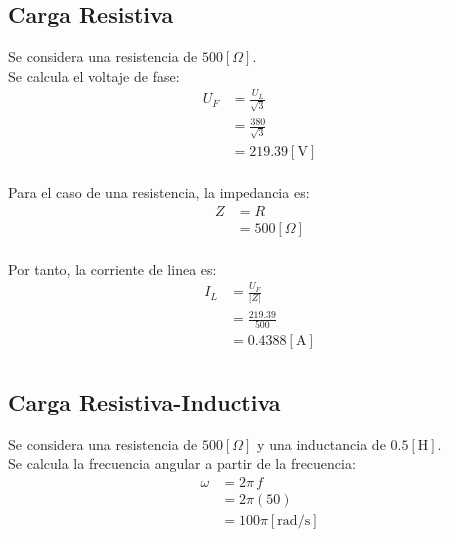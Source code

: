 \documentclass[letter,11pt]{article}
\begin{document}
\subsection{Carga Resistiva}
Se considera una resistencia de $500[\Omega]$.\\

Se calcula el voltaje de fase:
\begin{equation*}
    \begin{split}
        U_F&=\frac{U_L}{\sqrt{3}}\\
           &=\frac{380}{\sqrt{3}}\\
           &=219.39[\text{V}]\\
    \end{split}
\end{equation*}

Para el caso de una resistencia, la impedancia es:
\begin{equation*}
    \begin{split}
        Z&=R\\
         &=500[\Omega]\\
    \end{split}
\end{equation*}

Por tanto, la corriente de linea es:
\begin{equation*}
    \begin{split}
        I_L&=\frac{U_F}{|Z|}\\
           &=\frac{219.39}{500}\\
           &=0.4388[\text{A}]\\
    \end{split}
\end{equation*}

\vspace{0.6cm}
\subsection{Carga Resistiva-Inductiva}
Se considera una resistencia de $500[\Omega]$ y una inductancia de
$0.5[\text{H}]$.\\

Se calcula la frecuencia angular a partir de la frecuencia:
\begin{equation*}
    \begin{split}
        \omega&=2\pi\,f\\
              &=2\pi(50)\\
              &=100\pi[\text{rad}/\text{s}]\\
    \end{split}
\end{equation*}
\end{document}

